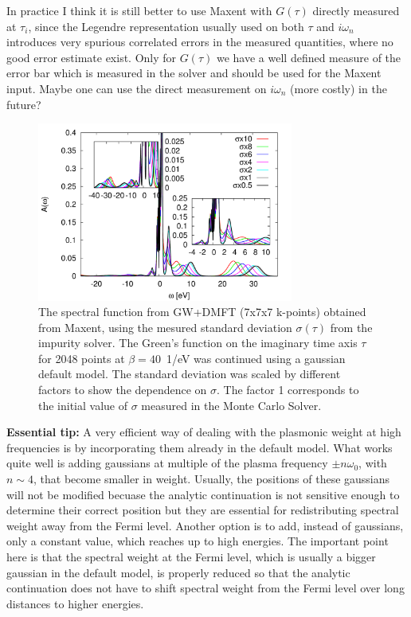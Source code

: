 \documentclass[12pt,a4paper]{scrartcl}
\numberwithin{equation}{section}
\begin{document}
In practice I think it is still better to use Maxent with $G(\tau)$
directly measured at $\tau_i$, since the Legendre representation usually used
on both $\tau$ and $i\omega_n$ introduces very spurious correlated errors
in the measured quantities, where no good error estimate exist.
Only for $G(\tau)$ we have a well defined measure of the error bar 
which is measured in the solver and should be used for the Maxent input. 
Maybe one can use the direct measurement on $i\omega_n$ (more costly)
in the future?

\begin{figure}[t]
\begin{center}
\includegraphics[width=0.75\textwidth]{figs/GWDMFT_maxent_diffSigma.pdf} 
\end{center}
\caption{The spectral function from GW+DMFT (7x7x7 k-points) obtained from
Maxent, using the mesured standard deviation $\sigma(\tau)$
from the impurity solver. The Green's function
on the imaginary time axis $\tau$ for 2048 points at $\beta=40$\ 1/eV was continued
using a gaussian default model. The standard deviation was scaled by different
factors to show the dependence on $\sigma$. The factor 1 corresponds
to the initial value of $\sigma$ measured in the Monte Carlo Solver.}
\label{fig:gwdmft_anacont_diff_sigma}
\end{figure}

\textbf{Essential tip:}
A very efficient way of dealing with the plasmonic weight at high frequencies
is by incorporating them already in the default model. What works quite well
is adding gaussians  at multiple of the plasma frequency 
$\pm n\omega_0$, with $n\sim 4$, that become smaller in weight.
Usually, the positions of these gaussians will not be modified becuase the 
analytic continuation is not sensitive enough to determine their correct position
but they are essential for redistributing spectral weight away from the Fermi level.
Another option is to add, instead of gaussians, only a constant value,
which reaches up to high energies. The important point here is that 
the spectral weight at the Fermi level, which is usually a bigger gaussian in
the default model, is properly reduced so that the analytic continuation
does not have to shift spectral weight from the Fermi level over long distances to higher
energies.
\end{document}
